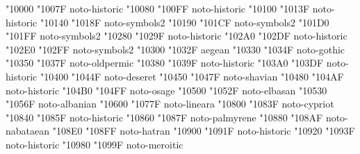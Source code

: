 \documentclass{article}
\begin{document}
                             { "10000} { "1007F} {noto-historic}
                             { "10080} { "100FF} {noto-historic}
                                 { "10100} { "1013F} {noto-historic}
                          { "10140} { "1018F} {noto-symbols2}
                                { "10190} { "101CF} {noto-symbols2}
                                  { "101D0} { "101FF} {noto-symbols2}
                                         { "10280} { "1029F} {noto-historic}
                                         { "102A0} { "102DF} {noto-historic}
                           { "102E0} { "102FF} {noto-symbols2}
                                     { "10300} { "1032F} {aegean}
                                         { "10330} { "1034F} {noto-gothic}
                                     { "10350} { "1037F} {noto-oldpermic}
                                       { "10380} { "1039F} {noto-historic}
                                    { "103A0} { "103DF} {noto-historic}
                                        { "10400} { "1044F} {noto-deseret}
                                        { "10450} { "1047F} {noto-shavian}
                                        { "10480} { "104AF} {noto-historic}
                                          { "104B0} { "104FF} {noto-osage}
                                        { "10500} { "1052F} {noto-elbasan}
                             { "10530} { "1056F} {noto-albanian}
                                       { "10600} { "1077F} {noto-lineara}
                              { "10800} { "1083F} {noto-cypriot}
                               { "10840} { "1085F} {noto-historic}
                                      { "10860} { "1087F} {noto-palmyrene}
                                      { "10880} { "108AF} {noto-nabataean}
                                         { "108E0} { "108FF} {noto-hatran}
                                     { "10900} { "1091F} {noto-historic}
                                         { "10920} { "1093F} {noto-historic}
                           { "10980} { "1099F} {noto-meroitic}
\end{document}
